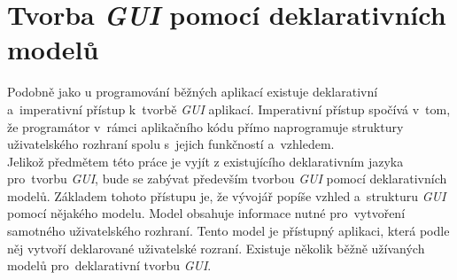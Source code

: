 \documentclass[11pt,twoside,a4paper]{book}
\begin{document}
\section[Deklarativní modely pro tvorbu \textit{GUI}]{\label{SEC:modelGUI}Tvorba \textit{GUI} pomocí deklarativních modelů}
Podobně jako u programování běžných aplikací existuje deklarativní a~imperativní přístup k~tvorbě \textit{GUI} aplikací. Imperativní přístup spočívá v~tom, že programátor v~rámci aplikačního kódu přímo naprogramuje struktury uživatelského rozhraní spolu s~jejich funkčností a~vzhledem.\\
Jelikož předmětem této práce je vyjít z existujícího deklarativním jazyka pro~tvorbu \textit{GUI}, bude se zabývat především tvorbou \textit{GUI} pomocí deklarativních modelů. Základem tohoto přístupu je, že vývojář popíše vzhled a~strukturu \textit{GUI} pomocí nějakého modelu. Model obsahuje informace nutné pro~vytvoření samotného uživatelského rozhraní. Tento model je přístupný aplikaci, která podle něj vytvoří deklarované uživatelské rozraní.
Existuje několik běžně užívaných modelů pro~deklarativní tvorbu \textit{GUI}.
\end{document}
